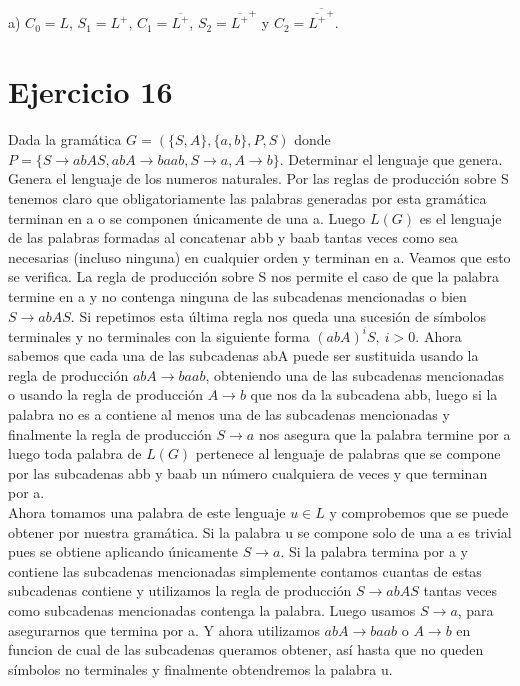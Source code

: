 \documentclass[a4paper,11pt]{article}
\begin{document}
a) $C_0 = L$, $S_1 = L^+$, $C_1 = \overline{L^+}$, $S_2 = \overline{L^+}^+$ y $C_2 = \overline{\overline{L^+}^+}$. 


\section{Ejercicio 16}
Dada la gramática $G = (\{S,A\},\{a,b\},P,S)$ donde $P = \{S \rightarrow abAS,abA \rightarrow baab, S\rightarrow a, A \rightarrow b\}$. Determinar el lenguaje que genera. \\


Genera el lenguaje de los numeros naturales.
Por las reglas de producción sobre S tenemos claro que obligatoriamente las palabras generadas por esta gramática terminan en a o se componen únicamente de una a. Luego $L(G)$ es el lenguaje de las palabras formadas al concatenar abb y baab tantas veces como sea necesarias (incluso ninguna) en cualquier orden y terminan en a. Veamos que esto se verifica. La regla de producción sobre S nos permite el caso de que la palabra termine en a y no contenga ninguna de las subcadenas mencionadas o bien $S \rightarrow abAS$. Si repetimos esta última regla nos queda una sucesión de símbolos terminales y no terminales con la siguiente forma $(abA)^iS, \> i > 0$. Ahora sabemos que cada una de las subcadenas abA puede ser sustituida usando la regla de producción $abA \rightarrow baab$, obteniendo una de las subcadenas mencionadas o usando la regla de producción $A \rightarrow b$ que nos da la subcadena abb, luego si la palabra no es a contiene al menos una de las subcadenas mencionadas y finalmente la regla de producción $S \rightarrow a$ nos asegura que la palabra termine por a luego toda palabra de $L(G)$ pertenece al lenguaje de palabras que se compone por las subcadenas abb y baab un número cualquiera de veces y que terminan por a. \\

Ahora tomamos una palabra de este lenguaje $u \in L$ y comprobemos que se puede obtener por nuestra gramática. Si la palabra u se compone solo de una a es trivial pues se obtiene aplicando únicamente $S \rightarrow a$. Si la palabra termina por a y contiene las subcadenas mencionadas simplemente contamos cuantas de estas subcadenas contiene y utilizamos la regla de producción $S \rightarrow abAS$ tantas veces como subcadenas mencionadas contenga la palabra. Luego usamos $S \rightarrow a$, para asegurarnos que termina por a. Y ahora utilizamos $abA \rightarrow baab$ o $A \rightarrow b$ en funcion de cual de las subcadenas queramos obtener, así hasta que no queden símbolos no terminales y finalmente obtendremos la palabra u.
\end{document}
